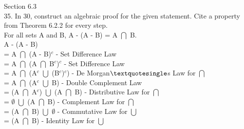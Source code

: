 \documentclass{article}
\let\oldemptyset\emptyset
\let\emptyset\varnothing
\begin{document}
Section 6.3\\
35. In 30, construct an algebraic proof for the given statement. Cite a property from Theorem 6.2.2 for every step. \\
For all sets A and B, A - (A - B) =  A $\bigcap$ B. \\
A - (A - B) \\
= A $\bigcap$ (A - B)$^c$ - Set Difference Law \\
= A $\bigcap$ (A $\bigcap$ B$^c$)$^c$ - Set Difference Law \\
= A $\bigcap$ (A$^c$ $\bigcup$ {(B$^c$)}$^c$) - De Morgan$\textquotesingle$s Law for $\bigcap$\\
= A $\bigcap$ (A$^c$ $\bigcup$ B) - Double Complement Law \\
= (A $\bigcap$ A$^c$) $\bigcup$ (A $\bigcap$ B) - Distributive Law for $\bigcap$\\
= $\oldemptyset$ $\bigcup$ (A $\bigcap$ B) - Complement Law for $\bigcap$\\
= (A $\bigcap$ B) $\bigcup$ $\oldemptyset$ - Commutative Law for $\bigcup$\\
= (A $\bigcap$ B) - Identity Law for $\bigcup$\\
\end{document}
